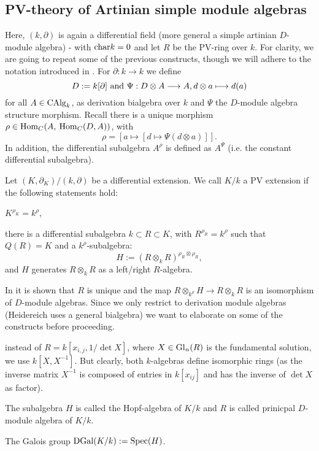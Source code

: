 \subsection{PV-theory of Artinian simple module algebras}
Here, $(k,\partial)$ is again a differential field (more general a simple artinian $D$-module algebra) - with $\mathrm{char} k = 0$ and let $R$ be the PV-ring over $k$. For clarity, we are going to repeat some of the previous constructs, though we will adhere to the notation introduced in \cite{Heid10}. For $\partial : k \longrightarrow k$ we define
$$D := k[\partial]\ \mathrm{and}\ \Psi : D \otimes A \longrightarrow A, d \otimes a \longmapsto d(a)$$
for all $A \in \mathrm{CAlg}_k$, as derivation bialgebra over $k$ and $\Psi$ the $D$-module algebra structure morphism. Recall there is a unique morphism $\rho \in \mathrm{Hom}_C(A,\:\mathrm{Hom}_C(D,A))$, with
$$\rho = \left[a \longmapsto \left[d \longmapsto \Psi(d \otimes a)\right]\right].$$
In addition, the differential subalgebra $A^\rho$ is defined as $A^\Psi$ (i.e. the constant differential subalgebra).
\begin{defi}
Let $(K, \partial_K)/(k,\partial)$ be a differential extension. We call $K/k$ a PV extension if the following statements hold:
\bn
\item $K^{\rho_K} = k^{\rho}$,
\item there is a differential subalgebra $k \subset R \subset K$, with $R^{\rho_R} = k^\rho$ such that $Q(R) = K$ and a $k^\rho$-subalgebra:
$$H := (R \otimes_k R)^{\rho_R \otimes \rho_R},$$
and $H$ generates $R\otimes_k R$ as a left/right $R$-algebra.
\en
\end{defi}
\bmk \label{HeidRemk} In \cite{Heid10} it is shown that $R$ is unique and the map $R \otimes_{k^\rho} H \longrightarrow R \otimes_k R$ is an isomorphism of $D$-module algebras. Since we only restrict to derivation module algebras (Heidereich uses a general bialgebra) we want to elaborate on some of the constructs before proceeding.
\bn
\item instead of $R = k[x_{i,j},1/\det X]$, where $X \in  \mathrm{Gl}_n(R)$ is the fundamental solution, we use $k[X,X^{-1}]$. But clearly, both $k$-algebras define isomorphic rings (as the inverse matrix $X^{-1}$ is composed of entries in $k[x_{ij}]$ and has the inverse of $\det X$ as factor).
\item The subalgebra $H$ is called the Hopf-algebra of $K/k$ and $R$ is called prinicpal $D$-module algebra of $K/k$.
\item The Galois group $\mathrm{DGal}(K/k) := \mathrm{Spec}(H)$.
